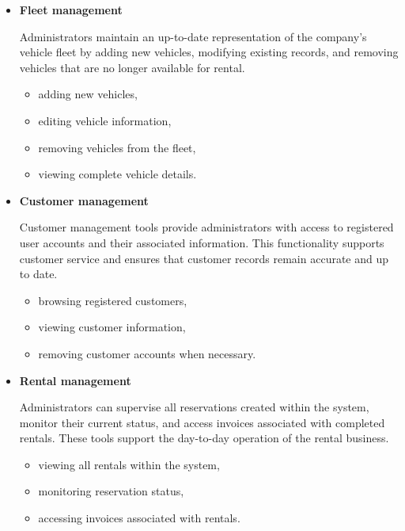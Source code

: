 \begin{itemize}

    \item \textbf{Fleet management}

    Administrators maintain an up-to-date representation of the company's vehicle fleet by adding new vehicles, modifying existing records, and removing vehicles that are no longer available for rental.

    \begin{itemize}
        \item adding new vehicles,
        \item editing vehicle information,
        \item removing vehicles from the fleet,
        \item viewing complete vehicle details.
    \end{itemize}

    \item \textbf{Customer management}

    Customer management tools provide administrators with access to registered user accounts and their associated information. This functionality supports customer service and ensures that customer records remain accurate and up to date.

    \begin{itemize}
        \item browsing registered customers,
        \item viewing customer information,
        \item removing customer accounts when necessary.
    \end{itemize}

    \item \textbf{Rental management}

    Administrators can supervise all reservations created within the system, monitor their current status, and access invoices associated with completed rentals. These tools support the day-to-day operation of the rental business.

    \begin{itemize}
        \item viewing all rentals within the system,
        \item monitoring reservation status,
        \item accessing invoices associated with rentals.
    \end{itemize}


\end{itemize}

